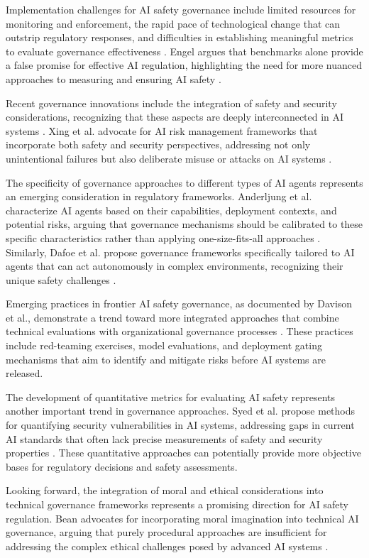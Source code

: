 \documentclass[conference]{IEEEtran}
\begin{document}
Implementation challenges for AI safety governance include limited resources for monitoring and enforcement, the rapid pace of technological change that can outstrip regulatory responses, and difficulties in establishing meaningful metrics to evaluate governance effectiveness \cite{2501.15693}. Engel argues that benchmarks alone provide a false promise for effective AI regulation, highlighting the need for more nuanced approaches to measuring and ensuring AI safety \cite{2501.15693}.

Recent governance innovations include the integration of safety and security considerations, recognizing that these aspects are deeply interconnected in AI systems \cite{2405.19524}. Xing et al. advocate for AI risk management frameworks that incorporate both safety and security perspectives, addressing not only unintentional failures but also deliberate misuse or attacks on AI systems \cite{2405.19524}.

The specificity of governance approaches to different types of AI agents represents an emerging consideration in regulatory frameworks. Anderljung et al. characterize AI agents based on their capabilities, deployment contexts, and potential risks, arguing that governance mechanisms should be calibrated to these specific characteristics rather than applying one-size-fits-all approaches \cite{2504.21848}. Similarly, Dafoe et al. propose governance frameworks specifically tailored to AI agents that can act autonomously in complex environments, recognizing their unique safety challenges \cite{2501.07913}.

Emerging practices in frontier AI safety governance, as documented by Davison et al., demonstrate a trend toward more integrated approaches that combine technical evaluations with organizational governance processes \cite{2503.04746}. These practices include red-teaming exercises, model evaluations, and deployment gating mechanisms that aim to identify and mitigate risks before AI systems are released.

The development of quantitative metrics for evaluating AI safety represents another important trend in governance approaches. Syed et al. propose methods for quantifying security vulnerabilities in AI systems, addressing gaps in current AI standards that often lack precise measurements of safety and security properties \cite{2502.08610}. These quantitative approaches can potentially provide more objective bases for regulatory decisions and safety assessments.

Looking forward, the integration of moral and ethical considerations into technical governance frameworks represents a promising direction for AI safety regulation. Bean advocates for incorporating moral imagination into technical AI governance, arguing that purely procedural approaches are insufficient for addressing the complex ethical challenges posed by advanced AI systems \cite{2503.06411}.
\end{document}
